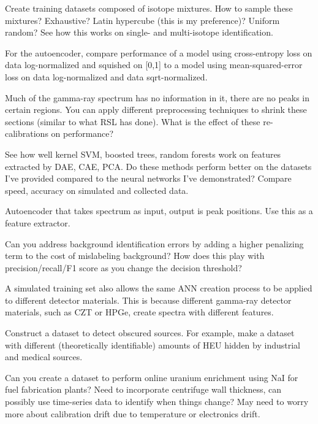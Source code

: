 Create training datasets composed of isotope mixtures. How to sample these mixtures? Exhaustive? Latin hypercube (this is my preference)? Uniform random? See how this works on single- and multi-isotope identification.

For the autoencoder, compare performance of a model using cross-entropy loss on data log-normalized and squished on [0,1] to a model using mean-squared-error loss on data log-normalized and data sqrt-normalized.


 

Much of the gamma-ray spectrum has no information in it, there are no peaks in certain regions. You can apply different preprocessing techniques to shrink these sections (similar to what RSL has done). What is the effect of these re-calibrations on performance?

See how well kernel SVM, boosted trees, random forests work on features extracted by DAE, CAE, PCA. Do these methods perform better on the datasets I've provided compared to the neural networks I've demonstrated? Compare speed, accuracy on simulated and collected data.

Autoencoder that takes spectrum as input, output is peak positions. Use this as a feature extractor. 

Can you address background identification errors by adding a higher penalizing term to the cost of mislabeling background? How does this play with precision/recall/F1 score as you change the decision threshold?

A simulated training set also allows the same ANN creation process to be applied to different detector materials. This is because different gamma-ray detector materials, such as CZT or HPGe, create spectra with different features.

Construct a dataset to detect obscured sources. For example, make a dataset with different (theoretically identifiable) amounts of HEU hidden by industrial and medical sources. 

Can you create a dataset to perform online uranium enrichment using NaI for fuel fabrication plants? Need to incorporate centrifuge wall thickness, can possibly use time-series data to identify when things change? May need to worry more about calibration drift due to temperature or electronics drift.



